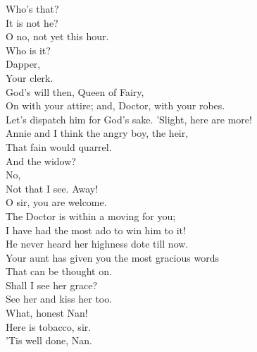 \documentclass[a4paper,oneside,12pt]{memoir}
\begin{document}
\begin{drama*}
\facespeaks {} Who's that?\\
\subtlespeaks {} It is not he?\\
\facespeaks O no, not yet this hour.\\
\subtlespeaks {} Who is it?\\
\dolspeaks {} Dapper,\\
Your clerk.\\
\facespeaks {} God's will then, Queen of Fairy,\\
On with your attire; and, Doctor, with your robes.\\
Let's dispatch him for God's sake.
 'Slight, here are more!\\
Annie and I think the angry boy, the heir,\\
That fain would quarrel.\\
\subtlespeaks {} And the widow?\\
\facespeaks {} No,\\
Not that I see. Away!\\
 O sir, you are welcome.\\
The Doctor is within a moving for you;\\
I have had the most ado to win him to it!\\
He never heard her highness dote till now.\\
Your aunt has given you the most gracious words\\
That can be thought on.\\
\dapperspeaks {} Shall I see her grace?\\
\facespeaks See her and kiss her too.\\
 What, honest Nan!\\
\druggerspeaks Here is tobacco, sir.\\
\facespeaks {} 'Tis well done, Nan.\\

\end{drama*}
\end{document}
